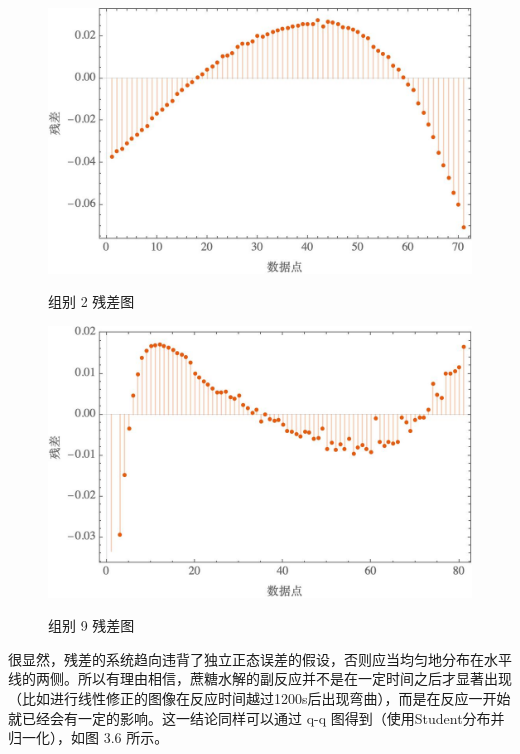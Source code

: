 \documentclass[12pt]{ctexart}
\numberwithin{equation}{section}
\begin{document}
\begin{figure}[!h]
    \begin{minipage}[t]{0.5\linewidth}
        \centering
        \includegraphics[scale=0.45]{residual2.jpg}
        \label{fig:first}
        \caption{组别 2 残差图}
    \end{minipage}
    \begin{minipage}[t]{0.5\linewidth}
        \centering
        \includegraphics[scale=0.45]{residual9.jpg}
        \label{fig:second}
        \caption{组别 9 残差图}
    \end{minipage}
    \end{figure}

    很显然，残差的系统趋向违背了独立正态误差的假设，否则应当均匀地分布在水平线的两侧。所以有理由相信，蔗糖水解的副反应并不是在一定时间之后才显著出现（比如进行线性修正的图像在反应时间越过1200s后出现弯曲），而是在反应一开始就已经会有一定的影响。这一结论同样可以通过 q-q 图得到（使用Student分布并归一化），如图 3.6 所示。
    \pagebreak
\end{document}
